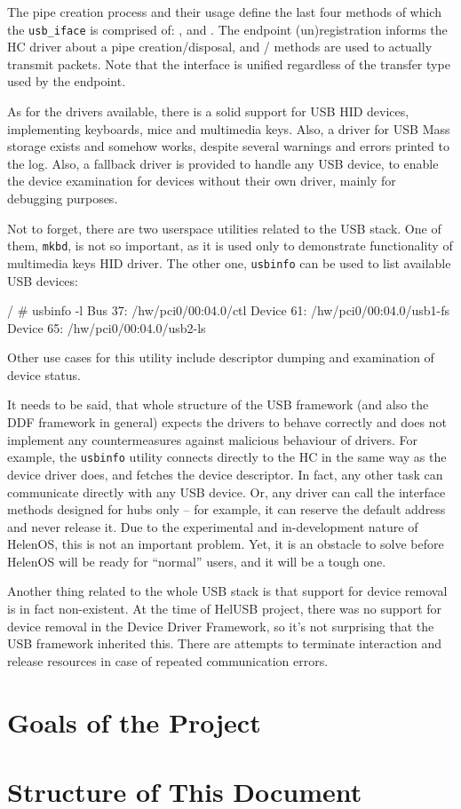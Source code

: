 The pipe creation process and their usage define the last four methods of which
the \texttt{usb\_iface} is comprised of: , 
and . The endpoint (un)registration informs the HC driver about
a pipe creation/disposal, and / methods are used to
actually transmit packets. Note that the interface is unified regardless of the
transfer type used by the endpoint.

As for the drivers available, there is a solid support for USB HID devices,
implementing keyboards, mice and multimedia keys. Also, a driver for USB Mass
storage exists and somehow works, despite several warnings and errors printed
to the log. Also, a fallback driver is provided to handle any USB device, to
enable the device examination for devices without their own driver, mainly for
debugging purposes.

Not to forget, there are two userspace utilities related to the USB stack. One
of them, \texttt{mkbd}, is not so important, as it is used only to demonstrate
functionality of multimedia keys HID driver. The other one, \texttt{usbinfo}
can be used to list available USB devices:

\begin{bdsh}
/ # usbinfo -l
Bus 37: /hw/pci0/00:04.0/ctl
	Device 61: /hw/pci0/00:04.0/usb1-fs
	Device 65: /hw/pci0/00:04.0/usb2-ls
\end{bdsh}

Other use cases for this utility include descriptor dumping and examination of
device status.

It needs to be said, that whole structure of the USB framework (and also the
DDF framework in general) expects the drivers to behave correctly and does not
implement any countermeasures against malicious behaviour of drivers. For
example, the \texttt{usbinfo} utility connects directly to the HC in the same
way as the device driver does, and fetches the device descriptor. In fact, any
other task can communicate directly with any USB device. Or, any driver can
call the interface methods designed for hubs only -- for example, it can
reserve the default address and never release it. Due to the experimental and
in-development nature of HelenOS, this is not an important problem. Yet, it is
an obstacle to solve before HelenOS will be ready for ``normal'' users, and it
will be a tough one.

Another thing related to the whole USB stack is that support for device
removal is in fact non-existent. At the time of HelUSB project, there was no
support for device removal in the Device Driver Framework, so it's not
surprising that the USB framework inherited this. There are attempts to
terminate interaction and release resources in case of repeated communication
errors.

\section{Goals of the Project}


\section{Structure of This Document}

